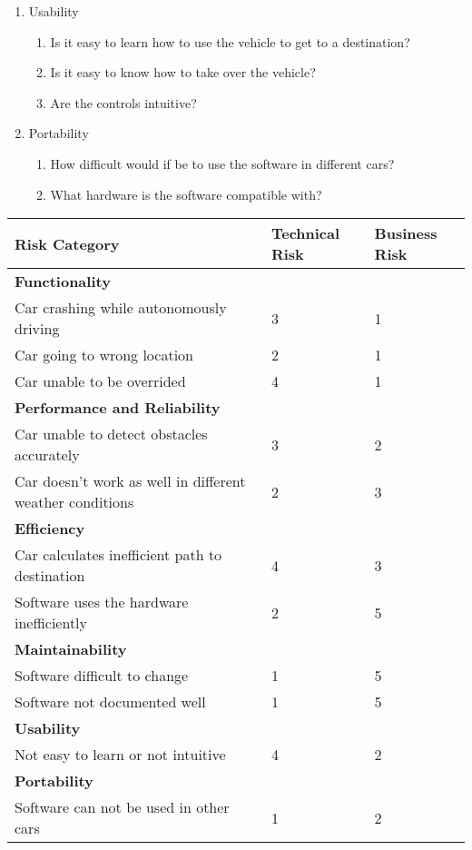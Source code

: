 \documentclass[12pt, letterpaper, titlepage]{article}
\begin{document}
\begin{enumerate}
\begin{enumerate}
            \end{enumerate}
        \item Usability
            \begin{enumerate}
                \item Is it easy to learn how to use the vehicle to get to a destination?
                \item Is it easy to know how to take over the vehicle?
                \item Are the controls intuitive?
            \end{enumerate}
        \item Portability
            \begin{enumerate}
                \item How difficult would if be to use the software in different cars?
                \item What hardware is the software compatible with?
            \end{enumerate}
    \end{enumerate}

    \begin{tabular}{|l|l|l|}
        \hline
        Risk Category & Technical Risk & Business Risk \\ \hline
        \textbf{Functionality} & & \\ \hline
        Car crashing while autonomously driving & 3  &  1  \\ \hline
        Car going to wrong location & 2 & 1 \\ \hline
        Car unable to be overrided & 4  &  1               \\ \hline
        \textbf{Performance and Reliability} & & \\ \hline
        Car unable to detect obstacles accurately & 3  &  2  \\ \hline
        Car doesn't work as well in different weather conditions & 2 & 3 \\ \hline
        \textbf{Efficiency} & & \\ \hline
        Car calculates inefficient path to destination & 4 &  3  \\ \hline
        Software uses the hardware inefficiently & 2 & 5 \\ \hline
        \textbf{Maintainability} & & \\ \hline
        Software difficult to change & 1 &  5  \\ \hline
        Software not documented well & 1 & 5 \\ \hline
        \textbf{Usability} & & \\ \hline
        Not easy to learn or not intuitive & 4 &  2  \\ \hline
        \textbf{Portability} & & \\ \hline
        Software can not be used in other cars & 1 &  2  \\ \hline
    \end{tabular}
\end{document}
